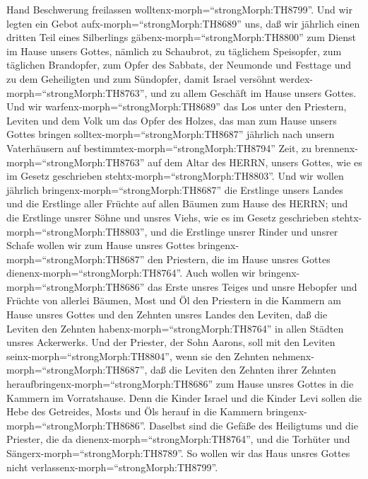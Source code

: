 Hand Beschwerung freilassen wolltenx-morph=``strongMorph:TH8799''.
 Und wir legten ein Gebot aufx-morph=``strongMorph:TH8689''
uns, daß wir jährlich einen dritten Teil eines Silberlings
gäbenx-morph=``strongMorph:TH8800'' zum Dienst im Hause unsers Gottes,
 nämlich zu Schaubrot, zu täglichem Speisopfer, zum
täglichen Brandopfer, zum Opfer des Sabbats, der Neumonde und Festtage
und zu dem Geheiligten und zum Sündopfer, damit Israel versöhnt
werdex-morph=``strongMorph:TH8763'', und zu allem Geschäft im Hause
unsers Gottes.  Und wir
warfenx-morph=``strongMorph:TH8689'' das Los unter den Priestern,
Leviten und dem Volk um das Opfer des Holzes, das man zum Hause unsers
Gottes bringen solltex-morph=``strongMorph:TH8687'' jährlich nach unsern
Vaterhäusern auf bestimmtex-morph=``strongMorph:TH8794'' Zeit, zu
brennenx-morph=``strongMorph:TH8763'' auf dem Altar des HERRN, unsers
Gottes, wie es im Gesetz geschrieben
stehtx-morph=``strongMorph:TH8803''.  Und wir wollen
jährlich bringenx-morph=``strongMorph:TH8687'' die Erstlinge unsers
Landes und die Erstlinge aller Früchte auf allen Bäumen zum Hause des
HERRN;  und die Erstlinge unsrer Söhne und unsres Viehs,
wie es im Gesetz geschrieben stehtx-morph=``strongMorph:TH8803'', und
die Erstlinge unsrer Rinder und unsrer Schafe wollen wir zum Hause
unsres Gottes bringenx-morph=``strongMorph:TH8687'' den Priestern, die
im Hause unsres Gottes dienenx-morph=``strongMorph:TH8764''.
 Auch wollen wir bringenx-morph=``strongMorph:TH8686'' das
Erste unsres Teiges und unsre Hebopfer und Früchte von allerlei Bäumen,
Most und Öl den Priestern in die Kammern am Hause unsres Gottes und den
Zehnten unsres Landes den Leviten, daß die Leviten den Zehnten
habenx-morph=``strongMorph:TH8764'' in allen Städten unsres Ackerwerks.
 Und der Priester, der Sohn Aarons, soll mit den Leviten
seinx-morph=``strongMorph:TH8804'', wenn sie den Zehnten
nehmenx-morph=``strongMorph:TH8687'', daß die Leviten den Zehnten ihrer
Zehnten heraufbringenx-morph=``strongMorph:TH8686'' zum Hause unsres
Gottes in die Kammern im Vorratshause.  Denn die Kinder
Israel und die Kinder Levi sollen die Hebe des Getreides, Mosts und Öls
herauf in die Kammern bringenx-morph=``strongMorph:TH8686''. Daselbst
sind die Gefäße des Heiligtums und die Priester, die da
dienenx-morph=``strongMorph:TH8764'', und die Torhüter und
Sängerx-morph=``strongMorph:TH8789''. So wollen wir das Haus unsres
Gottes nicht verlassenx-morph=``strongMorph:TH8799''.

